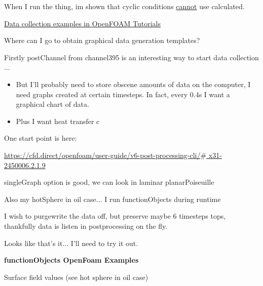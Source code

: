 \documentclass[12pt]{article}
\renewcommand{\_}{\kern-1.5pt\textunderscore\kern-1.5pt}
\begin{document}
\vspace{\baselineskip}
When I run the thing, im shown that cyclic conditions \uline{cannot} use calculated.\par

\uline{Data collection examples in OpenFOAM Tutorials}\par

Where can I go to obtain graphical data generation templates?\par

Firstly postChannel from channel395 is an interesting way to start data collection$ \ldots $ \par
\begin{itemize}
	\item But I’ll probably need to store obscene amounts of data on the computer, I need graphs created at certain timesteps. In fact, every 0.4s I want a graphical chart of data.\par

	\item Plus I want heat transfer c\par
\end{itemize}


One start point is here:\par

\href{https://cfd.direct/openfoam/user-guide/v6-post-processing-cli/}{https://cfd.direct/openfoam/user-guide/v6-post-processing-cli/$\#$ x31-2450006.2.1.9}\par

singleGraph option is good, we can look in laminar planarPoiseuille\par

\par

Also my hotSphere in oil case$ \ldots $  I run functionObjects during runtime\par

I wish to purgewrite the data off, but preserve maybe 6 timesteps tops, thankfully data is listen in postprocessing on the fly.\par

Looks like that’s it$ \ldots $  I’ll need to try it out.\par


\vspace{\baselineskip}
\textbf{functionObjects OpenFoam Examples}\par

Surface field values (see hot sphere in oil case)\par
\end{document}
